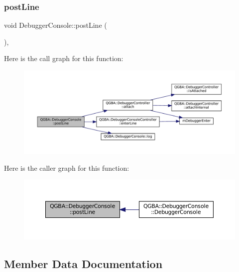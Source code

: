 \subsubsection{\texorpdfstring{post\+Line}{postLine}}
{\footnotesize\ttfamily void Debugger\+Console\+::post\+Line (\begin{DoxyParamCaption}{ }\end{DoxyParamCaption})\hspace{0.3cm}{\ttfamily [private]}, {\ttfamily [slot]}}

Here is the call graph for this function\+:
\nopagebreak
\begin{figure}[H]
\begin{center}
\leavevmode
\includegraphics[width=350pt]{class_q_g_b_a_1_1_debugger_console_a6364d65b410dd27638c5efc20fcb1559_cgraph}
\end{center}
\end{figure}
Here is the caller graph for this function\+:
\nopagebreak
\begin{figure}[H]
\begin{center}
\leavevmode
\includegraphics[width=350pt]{class_q_g_b_a_1_1_debugger_console_a6364d65b410dd27638c5efc20fcb1559_icgraph}
\end{center}
\end{figure}


\subsection{Member Data Documentation}
\mbox{\label{class_q_g_b_a_1_1_debugger_console_a305eb9fc67054eeb8205d43cd744f2b5}} 
